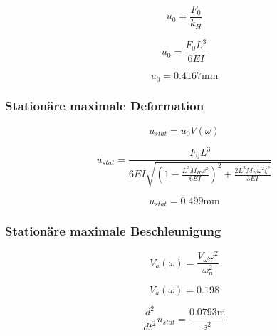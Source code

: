 \documentclass[
  letterpaper,
  DIV=11]{scrreprt}
\begin{document}
\begin{equation}u_{0} = \frac{F_{0}}{k_{H}}\end{equation}

\begin{equation}u_{0} = \frac{F_{0} L^{3}}{6 E I}\end{equation}

\begin{equation}u_{0} = 0.4167 \text{mm}\end{equation}

\hypertarget{stationuxe4re-maximale-deformation}{%
\subsubsection{Stationäre maximale
Deformation}\label{stationuxe4re-maximale-deformation}}

\begin{equation}u_{stat} = u_{0} V{\left(\omega \right)}\end{equation}

\begin{equation}u_{stat} = \frac{F_{0} L^{3}}{6 E I \sqrt{\left(1 - \frac{L^{3} M_{H} \omega^{2}}{6 E I}\right)^{2} + \frac{2 L^{3} M_{H} \omega^{2} \zeta^{2}}{3 E I}}}\end{equation}

\begin{equation}u_{stat} = 0.499 \text{mm}\end{equation}

\hypertarget{stationuxe4re-maximale-beschleunigung}{%
\subsubsection{Stationäre maximale
Beschleunigung}\label{stationuxe4re-maximale-beschleunigung}}

\begin{equation}V_{a}{\left(\omega \right)} = \frac{V_{\omega} \omega^{2}}{\omega_{n}^{2}}\end{equation}

\begin{equation}V_{a}{\left(\omega \right)} = 0.198\end{equation}

\begin{equation}\frac{d^{2}}{d t^{2}} u_{stat} = \frac{0.0793 \text{m}}{\text{s}^{2}}\end{equation}
\end{document}
